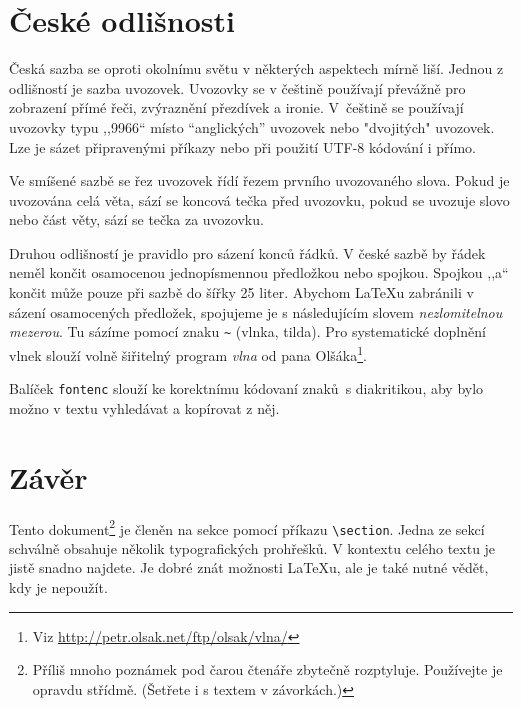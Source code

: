 \documentclass[a4paper, 10pt, twocolumn, hidelinks]{article}
\begin{document}
\section{České odlišnosti}

Česká sazba se oproti okolnímu světu v některých aspektech mírně liší. Jednou z odlišností je sazba uvozovek. Uvozovky se v češtině používají převážně pro zobrazení přímé řeči, zvýraznění přezdívek a ironie. V~češtině se používají uvozovky typu ,,9966`` místo ``anglických'' uvozovek nebo "dvojitých" uvozovek. Lze je sázet připravenými příkazy nebo při použití UTF-8 kó\-dování i přímo.

Ve smíšené sazbě se řez uvozovek řídí řezem prvního uvozovaného slova. Pokud je uvozována celá věta, sází se koncová tečka před uvozovku, pokud se uvozuje slovo nebo část věty, sází se tečka za uvozovku.

Druhou odlišností je pravidlo pro sázení konců řádků. V české sazbě by řádek neměl končit osamocenou jednopísmennou předložkou nebo spojkou. Spojkou ,,a`` končit může pouze při sazbě do šířky 25 li\-ter. Abychom {\LaTeX}u zabránili v sázení osamocených \mbox{předložek}, spojujeme je s následujícím slovem \emph{nezlomitelnou mezerou}. Tu sázíme pomocí znaku \verb|~| (vlnka, tilda). Pro systematické doplnění vlnek slouží volně šiřitelný program \emph{vlna} od pana Olšáka\footnote{Viz \url{http://petr.olsak.net/ftp/olsak/vlna/}}.

Balíček \texttt{fontenc} slouží ke korektnímu kódovaní znaků~s diakritikou, aby bylo možno v textu vyhledávat a kopírovat z něj.
\medskip
\medskip
\section{Závěr}
Tento dokument\footnote{Příliš mnoho poznámek pod čarou čtenáře zbytečně rozptyluje. Používejte je opravdu střídmě. (Šetřete i s textem v závorkách.)} je členěn na sekce pomocí příkazu \verb|\section|. Jedna ze sekcí schválně obsahuje několik typografických prohřešků. V kontextu celého textu je jistě snadno najdete. Je dobré znát možnosti {\LaTeX}u, ale je také nutné vědět, kdy je nepoužít.
\end{document}
